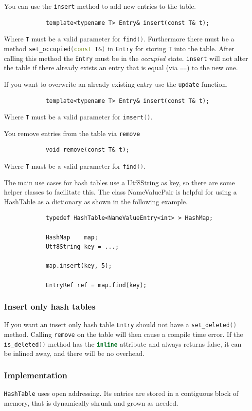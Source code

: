 \documentclass[12pt,a4paper,oneside]{article}
\newcommand{\cpp}[1]{\lstinline[language=C++]{#1}}
\begin{document}
	You can use the \cpp{insert} method to add new entries to the table.
		\begin{lstlisting}
			template<typename T> Entry& insert(const T& t);
		\end{lstlisting}
	Where \cpp{T} must be a valid parameter for \cpp{find()}. 
	Furthermore there must be a method \cpp{set_occupied(const T&)} in \cpp{Entry} for storing \cpp{T} into the table.
	After calling this method the \cpp{Entry} must be in the \emph{occupied} state.
	\cpp{insert} will not alter the table if there already exists an entry that is equal (via \cpp{==}) to the new one.


	If you want to overwrite an already existing entry use the \cpp{update} function.
		\begin{lstlisting}
			template<typename T> Entry& insert(const T& t);
		\end{lstlisting}
	Where \cpp{T} must be a valid parameter for \cpp{insert()}. 


	You remove entries from the table via \cpp{remove}
		\begin{lstlisting}
			void remove(const T& t);
		\end{lstlisting}
	Where \cpp{T} must be a valid parameter for \cpp{find()}. 

	The main use cases for hash tables use a Utf8String as key, so there are some helper classes to facilitate this.
	The class NameValuePair is helpful for using a HashTable as a dictionary as shown in the following example.
		\begin{lstlisting}
			typedef HashTable<NameValueEntry<int> > HashMap;

			HashMap    map;
			Utf8String key = ...;

			map.insert(key, 5);

			EntryRef ref = map.find(key);
		\end{lstlisting}

\subsubsection{Insert only hash tables}
	If you want an insert only hash table \cpp{Entry} should not have a \cpp{set_deleted()}
	method. Calling \cpp{remove} on the table will then cause a compile time error.
	If the \cpp{is_deleted()} method has the \cpp{inline} attribute and always returns false,
	it can be inlined away, and there will be no overhead.

\subsubsection{Implementation}
	\cpp{HashTable} uses open addressing.
	Its entries are stored in a contiguous block of memory, that is dynamically shrunk and 
	grown as needed.
\end{document}
